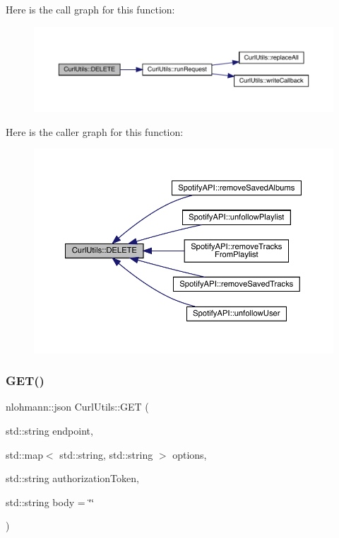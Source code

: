 Here is the call graph for this function\+:
\nopagebreak
\begin{figure}[H]
\begin{center}
\leavevmode
\includegraphics[width=350pt]{class_curl_utils_aa78fe6e8b55d787002b7089e70473558_cgraph}
\end{center}
\end{figure}
Here is the caller graph for this function\+:
\nopagebreak
\begin{figure}[H]
\begin{center}
\leavevmode
\includegraphics[width=350pt]{class_curl_utils_aa78fe6e8b55d787002b7089e70473558_icgraph}
\end{center}
\end{figure}
\mbox{\label{class_curl_utils_ac500280637c99900b1f1e64d5be58733}} 
\subsubsection{\texorpdfstring{G\+E\+T()}{GET()}}
{\footnotesize\ttfamily nlohmann\+::json Curl\+Utils\+::\+G\+ET (\begin{DoxyParamCaption}\item[{std\+::string}]{endpoint,  }\item[{std\+::map$<$ std\+::string, std\+::string $>$}]{options,  }\item[{std\+::string}]{authorization\+Token,  }\item[{std\+::string}]{body = {\ttfamily \char`\"{}\char`\"{}} }\end{DoxyParamCaption})}



